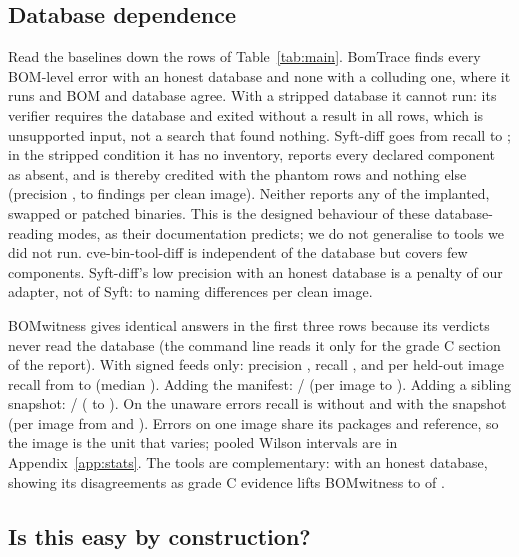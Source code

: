 \documentclass[sigconf,nonacm]{acmart}
\newcommand{\tool}{BOMwitness}
\begin{document}
\subsection{Database dependence}

Read the baselines down the rows of Table~\ref{tab:main}. BomTrace finds every BOM-level error with an honest database and none with a colluding one, where it runs and BOM and database agree. With a stripped database it cannot run: its verifier requires the database and exited without a result in all \btStrNoResult{} rows, which is unsupported input, not a search that found nothing. Syft-diff goes from recall \rHonSy{} to \rColSy; in the stripped condition it has no inventory, reports every declared component as absent, and is thereby credited with the \syStrCredited{} phantom rows and nothing else (precision \pStrSy, \syftCleanStrMin{} to \syftCleanStrMax{} findings per clean image). Neither reports any of the \nUnawareCases{} implanted, swapped or patched binaries. This is the designed behaviour of these database-reading modes, as their documentation predicts; we do not generalise to tools we did not run. cve-bin-tool-diff is independent of the database but covers few components. Syft-diff's low precision with an honest database is a penalty of our adapter, not of Syft: \syftCleanMin{} to \syftCleanMax{} naming differences per clean image.

\tool{} gives identical answers in the first three rows because its verdicts never read the database (the command line reads it only for the grade C section of the report). With signed feeds only: precision \pColFo, recall \rColFo, and per held-out image recall from \imgMinColFo{} to \imgMaxColFo{} (median \imgMedColFo). Adding the manifest: \pColNs{} / \rColNs{} (per image \imgMinColNs{} to \imgMaxColNs). Adding a sibling snapshot: \pColBw{} / \rColBw{} (\imgMinColBw{} to \imgMaxColBw). On the unaware errors recall is \rUnaFo{} without and \rUnaBw{} with the snapshot (per image from \imgMinUnaNs{} and \imgMinUnaBw). Errors on one image share its packages and reference, so the image is the unit that varies; pooled Wilson intervals are in Appendix~\ref{app:stats}. The tools are complementary: with an honest database, showing its disagreements as grade C evidence lifts \tool{} to \tpHonWithDb{} of \nBomErrCases.

\subsection{Is this easy by construction?}
\label{sec:easy}
\end{document}
